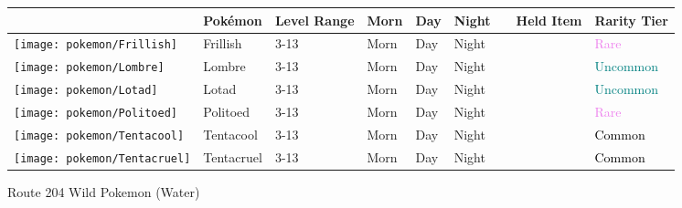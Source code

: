 \begin{longtable}{||l l l l l l l l l||}%
\hline%
&Pokémon&Level Range&Morn&Day&Night&&Held Item&Rarity Tier\\%
\hline%
\endhead%
\hline%
\texttt{[image: pokemon/Frillish]}&Frillish&3{-}13&Morn&Day&Night&&&\textcolor{violet}{%
Rare%
}\\%
\hline%
\texttt{[image: pokemon/Lombre]}&Lombre&3{-}13&Morn&Day&Night&&&\textcolor{teal}{%
Uncommon%
}\\%
\hline%
\texttt{[image: pokemon/Lotad]}&Lotad&3{-}13&Morn&Day&Night&&&\textcolor{teal}{%
Uncommon%
}\\%
\hline%
\texttt{[image: pokemon/Politoed]}&Politoed&3{-}13&Morn&Day&Night&&&\textcolor{violet}{%
Rare%
}\\%
\hline%
\texttt{[image: pokemon/Tentacool]}&Tentacool&3{-}13&Morn&Day&Night&&&\textcolor{black}{%
Common%
}\\%
\hline%
\texttt{[image: pokemon/Tentacruel]}&Tentacruel&3{-}13&Morn&Day&Night&&&\textcolor{black}{%
Common%
}\\%
\hline%
\end{longtable}%
\caption{Route 204 Wild Pokemon (Water)}